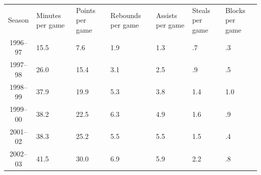 	\begin{table}
	\centering
		\begin{tabularx}{\textwidth}{| c | Y | Y | Y | Y | Y | Y |}
			Season  & Minutes per game  & Points per game  & Rebounds per game & Assists per game &	Steals per game & Blocks per game \\
			1996–97 & 15.5 & 7.6  & 1.9 & 1.3 &  .7	&  .3 \\
			1997–98	& 26.0 & 15.4 &	3.1	& 2.5 &	 .9	&  .5 \\
			1998–99	& 37.9 & 19.9 &	5.3 & 3.8 &	1.4	& 1.0 \\
			1999–00	& 38.2 & 22.5 &	6.3	& 4.9 &	1.6	&  .9 \\
			2001–02 & 38.3 & 25.2 &	5.5	& 5.5 &	1.5	&  .4 \\
			2002–03 & 41.5 & 30.0 & 6.9 & 5.9 & 2.2 &  .8 \\
		\end{tabularx}
	\end{table}
